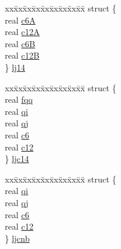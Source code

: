 \begin{DoxyCompactItemize}
\begin{tabbing}
\end{tabbing}\item 
\begin{tabbing}
xx\=xx\=xx\=xx\=xx\=xx\=xx\=xx\=xx\=\kill
struct \{\\
\>real \hyperlink{uniont__iparams_a9f29164694f117d0d90699b916bf12e5}{c6A}\\
\>real \hyperlink{uniont__iparams_a2344777c6058fbdddb70ed30989ebc8a}{c12A}\\
\>real \hyperlink{uniont__iparams_a8a55bc3a5f007f519c6f5545f7ede08b}{c6B}\\
\>real \hyperlink{uniont__iparams_ac5329b0c789ca70c35648823a5bf0e2a}{c12B}\\
\} \hyperlink{uniont__iparams_a8770008aec0b39fab666d2812f98265b}{lj14}\\

\end{tabbing}\item 
\begin{tabbing}
xx\=xx\=xx\=xx\=xx\=xx\=xx\=xx\=xx\=\kill
struct \{\\
\>real \hyperlink{uniont__iparams_a3844045a1a4b1046e8037533a72903ef}{fqq}\\
\>real \hyperlink{uniont__iparams_aee9581fe6302a3c112b667e437e3c374}{qi}\\
\>real \hyperlink{uniont__iparams_af62340e9efc92aa98baed368eea14545}{qj}\\
\>real \hyperlink{uniont__iparams_ae0a64b8b583399113b65d1c5ec18a4fc}{c6}\\
\>real \hyperlink{uniont__iparams_a002c6e10a70be28bfb67d6c8e8d5c426}{c12}\\
\} \hyperlink{uniont__iparams_a34c007ac59ebe9d772fac1e9d45d89de}{ljc14}\\

\end{tabbing}\item 
\begin{tabbing}
xx\=xx\=xx\=xx\=xx\=xx\=xx\=xx\=xx\=\kill
struct \{\\
\>real \hyperlink{uniont__iparams_aee9581fe6302a3c112b667e437e3c374}{qi}\\
\>real \hyperlink{uniont__iparams_af62340e9efc92aa98baed368eea14545}{qj}\\
\>real \hyperlink{uniont__iparams_ae0a64b8b583399113b65d1c5ec18a4fc}{c6}\\
\>real \hyperlink{uniont__iparams_a002c6e10a70be28bfb67d6c8e8d5c426}{c12}\\
\} \hyperlink{uniont__iparams_aaf35e6b84bf48e3c65fefe488e13a309}{ljcnb}\\


\end{tabbing}
\end{DoxyCompactItemize}
